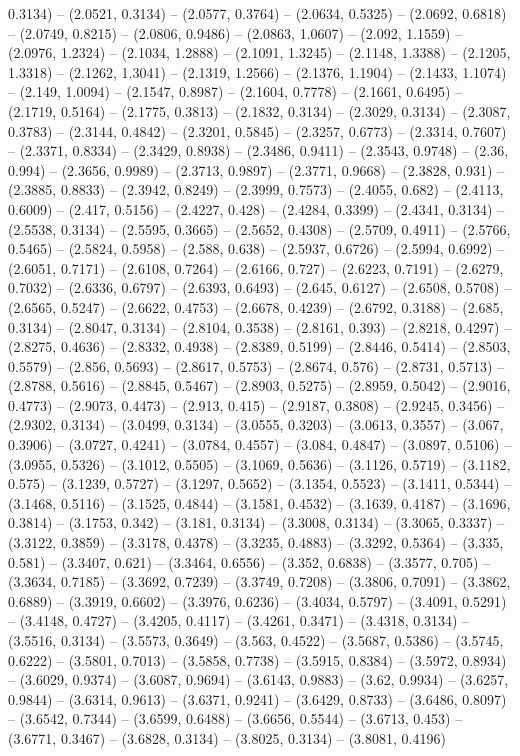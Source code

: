 0.3134) -- (2.0521, 0.3134) -- (2.0577, 0.3764) -- (2.0634, 0.5325) -- (2.0692, 0.6818) -- (2.0749, 0.8215) -- (2.0806, 0.9486) -- (2.0863, 1.0607) -- (2.092, 1.1559) -- (2.0976, 1.2324) -- (2.1034, 1.2888) -- (2.1091, 1.3245) -- (2.1148, 1.3388) -- (2.1205, 1.3318) -- (2.1262, 1.3041) -- (2.1319, 1.2566) -- (2.1376, 1.1904) -- (2.1433, 1.1074) -- (2.149, 1.0094) -- (2.1547, 0.8987) -- (2.1604, 0.7778) -- (2.1661, 0.6495) -- (2.1719, 0.5164) -- (2.1775, 0.3813) -- (2.1832, 0.3134) -- (2.3029, 0.3134) -- (2.3087, 0.3783) -- (2.3144, 0.4842) -- (2.3201, 0.5845) -- (2.3257, 0.6773) -- (2.3314, 0.7607) -- (2.3371, 0.8334) -- (2.3429, 0.8938) -- (2.3486, 0.9411) -- (2.3543, 0.9748) -- (2.36, 0.994) -- (2.3656, 0.9989) -- (2.3713, 0.9897) -- (2.3771, 0.9668) -- (2.3828, 0.931) -- (2.3885, 0.8833) -- (2.3942, 0.8249) -- (2.3999, 0.7573) -- (2.4055, 0.682) -- (2.4113, 0.6009) -- (2.417, 0.5156) -- (2.4227, 0.428) -- (2.4284, 0.3399) -- (2.4341, 0.3134) -- (2.5538, 0.3134) -- (2.5595, 0.3665) -- (2.5652, 0.4308) -- (2.5709, 0.4911) -- (2.5766, 0.5465) -- (2.5824, 0.5958) -- (2.588, 0.638) -- (2.5937, 0.6726) -- (2.5994, 0.6992) -- (2.6051, 0.7171) -- (2.6108, 0.7264) -- (2.6166, 0.727) -- (2.6223, 0.7191) -- (2.6279, 0.7032) -- (2.6336, 0.6797) -- (2.6393, 0.6493) -- (2.645, 0.6127) -- (2.6508, 0.5708) -- (2.6565, 0.5247) -- (2.6622, 0.4753) -- (2.6678, 0.4239) -- (2.6792, 0.3188) -- (2.685, 0.3134) -- (2.8047, 0.3134) -- (2.8104, 0.3538) -- (2.8161, 0.393) -- (2.8218, 0.4297) -- (2.8275, 0.4636) -- (2.8332, 0.4938) -- (2.8389, 0.5199) -- (2.8446, 0.5414) -- (2.8503, 0.5579) -- (2.856, 0.5693) -- (2.8617, 0.5753) -- (2.8674, 0.576) -- (2.8731, 0.5713) -- (2.8788, 0.5616) -- (2.8845, 0.5467) -- (2.8903, 0.5275) -- (2.8959, 0.5042) -- (2.9016, 0.4773) -- (2.9073, 0.4473) -- (2.913, 0.415) -- (2.9187, 0.3808) -- (2.9245, 0.3456) -- (2.9302, 0.3134) -- (3.0499, 0.3134) -- (3.0555, 0.3203) -- (3.0613, 0.3557) -- (3.067, 0.3906) -- (3.0727, 0.4241) -- (3.0784, 0.4557) -- (3.084, 0.4847) -- (3.0897, 0.5106) -- (3.0955, 0.5326) -- (3.1012, 0.5505) -- (3.1069, 0.5636) -- (3.1126, 0.5719) -- (3.1182, 0.575) -- (3.1239, 0.5727) -- (3.1297, 0.5652) -- (3.1354, 0.5523) -- (3.1411, 0.5344) -- (3.1468, 0.5116) -- (3.1525, 0.4844) -- (3.1581, 0.4532) -- (3.1639, 0.4187) -- (3.1696, 0.3814) -- (3.1753, 0.342) -- (3.181, 0.3134) -- (3.3008, 0.3134) -- (3.3065, 0.3337) -- (3.3122, 0.3859) -- (3.3178, 0.4378) -- (3.3235, 0.4883) -- (3.3292, 0.5364) -- (3.335, 0.581) -- (3.3407, 0.621) -- (3.3464, 0.6556) -- (3.352, 0.6838) -- (3.3577, 0.705) -- (3.3634, 0.7185) -- (3.3692, 0.7239) -- (3.3749, 0.7208) -- (3.3806, 0.7091) -- (3.3862, 0.6889) -- (3.3919, 0.6602) -- (3.3976, 0.6236) -- (3.4034, 0.5797) -- (3.4091, 0.5291) -- (3.4148, 0.4727) -- (3.4205, 0.4117) -- (3.4261, 0.3471) -- (3.4318, 0.3134) -- (3.5516, 0.3134) -- (3.5573, 0.3649) -- (3.563, 0.4522) -- (3.5687, 0.5386) -- (3.5745, 0.6222) -- (3.5801, 0.7013) -- (3.5858, 0.7738) -- (3.5915, 0.8384) -- (3.5972, 0.8934) -- (3.6029, 0.9374) -- (3.6087, 0.9694) -- (3.6143, 0.9883) -- (3.62, 0.9934) -- (3.6257, 0.9844) -- (3.6314, 0.9613) -- (3.6371, 0.9241) -- (3.6429, 0.8733) -- (3.6486, 0.8097) -- (3.6542, 0.7344) -- (3.6599, 0.6488) -- (3.6656, 0.5544) -- (3.6713, 0.453) -- (3.6771, 0.3467) -- (3.6828, 0.3134) -- (3.8025, 0.3134) -- (3.8081, 0.4196) 